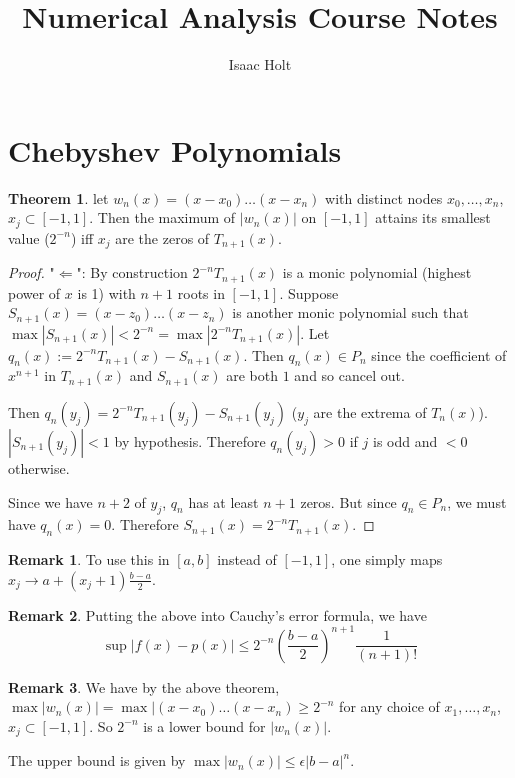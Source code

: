 \documentclass[12pt,a4paper]{article}
\title{Numerical Analysis Course Notes}
\author{Isaac Holt}
\theoremstyle{definition}
\newtheorem{theorem}[definition]{Theorem}
\newtheorem*{remark}{Remark}
\begin{document}
\maketitle

\section{Chebyshev Polynomials}

\begin{theorem}
let $w_n(x) = (x - x_0) \dots (x - x_n)$ with distinct nodes ${x_0, \dots, x_n}$, $x_j \subset [-1, 1]$. Then the maximum of $|w_n(x)|$ on $[-1, 1]$ attains its smallest value ($2^{-n}$) iff ${x_j}$ are the zeros of $T_{n + 1}(x)$.
\end{theorem}

\begin{proof}
	"$\Longleftarrow$": By construction $2^{-n} T_{n+1}(x)$ is a monic polynomial (highest power of $x$ is 1) with $n + 1$ roots in $[-1, 1]$. Suppose $S_{n+1}(x) = (x - z_0)\dots(x - z_n)$ is another monic polynomial such that $\max |S_{n+1}(x)| < 2^{-n} = \max |2^{-n} T_{n+1}(x)|$. Let $q_n(x) := 2^{-n} T_{n+1}(x) - S_{n+1}(x)$. Then $q_n(x) \in P_n$ since the coefficient of $x^{n+1}$ in $T_{n+1}(x)$ and $S_{n+1}(x)$ are both $1$ and so cancel out.

	Then $q_n(y_j) = 2^{-n} T_{n+1}(y_j) - S_{n+1}(y_j)$ ($y_j$ are the extrema of $T_n(x)$). $|S_{n+1}(y_j)| < 1$ by hypothesis. Therefore $q_n(y_j) > 0$ if $j$ is odd and $< 0$ otherwise.

	Since we have $n+2$ of $y_j$, $q_n$ has at least $n+1$ zeros. But since $q_n \in P_n$, we must have $q_n(x)=0$. Therefore $S_{n+1}(x) = 2^{-n} T_{n+1}(x)$. 
\end{proof}

\begin{remark}
	To use this in $[a, b]$ instead of $[-1, 1]$, one simply maps $x_j \rightarrow a + (x_j + 1) \frac{b - a}{2}$.
\end{remark}

\begin{remark}
	Putting the above into Cauchy's error formula,
	we have \[\sup |f(x)-p(x)| \le 2^{-n} {(\frac{b - a}{2})}^{n + 1} \frac{1}{(n + 1)!}\]
\end{remark}

\begin{remark}
	We have by the above theorem, $\max |w_n(x)| = \max |(x - x_0)\dots(x - x_n) \ge 2^{-n}$ for any choice of ${x_1, \dots, x_n}$, $x_j \subset [-1, 1]$. So $2^{-n}$ is a lower bound for $|w_n(x)|$.

	The upper bound is given by $\max |w_n(x)| \le \epsilon |b-a|^n$. 
\end{remark}
\end{document}
